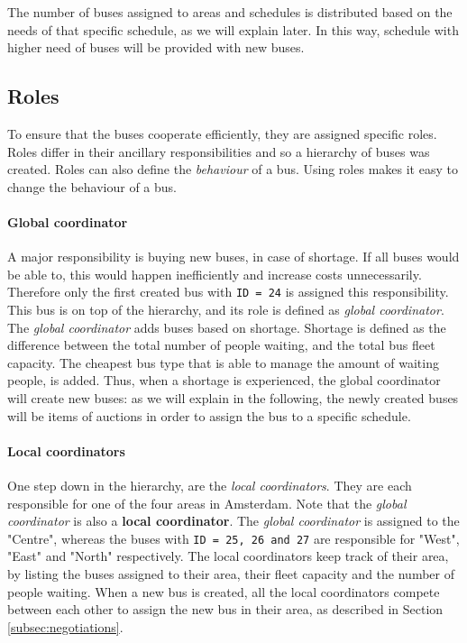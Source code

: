 \documentclass{article}
\begin{document}
The number of buses assigned to areas and schedules is distributed based on the needs of that specific schedule, as we will explain later. In this way, schedule with higher need of buses will be provided with new buses.

\subsection{Roles}
\label{subsec:roles}
To ensure that the buses cooperate efficiently, they are assigned specific roles. Roles differ in their ancillary responsibilities and so a hierarchy of buses was created. 
\newline
Roles can also define the \textit{behaviour} of a bus. Using roles makes it easy to change the behaviour of a bus. 
\paragraph{Global coordinator}
A major responsibility is buying new buses, in case of shortage. If all buses would be able to, this would happen inefficiently and increase costs unnecessarily. Therefore only the first created bus with \texttt{ID = 24} is assigned this responsibility. This bus is on top of the hierarchy, and its role is defined as \textit{global coordinator}. 
\newline
The \textit{global coordinator} adds buses based on shortage. Shortage is defined as the difference between the total number of people waiting, and the total bus fleet capacity. The cheapest bus type that is able to manage the amount of waiting people, is added. Thus, when a shortage is experienced, the global coordinator will create new buses: as we will explain in the following, the newly created buses will be items of auctions in order to assign the bus to a specific schedule.

\paragraph{Local coordinators}
One step down in the hierarchy, are the \textit{local coordinators}. They are each responsible for one of the four areas in Amsterdam. Note that the \textit{global coordinator} is also a \textbf{local coordinator}. The \textit{global coordinator} is assigned to the "Centre", whereas the buses with \texttt{ID = 25, 26 and 27} are responsible for "West", "East" and "North" respectively. The local coordinators keep track of their area, by listing the buses assigned to their area, their fleet capacity and the number of people waiting. When a new bus is created, all the local coordinators compete between each other to assign the new bus in their area, as described in Section \ref{subsec:negotiations}.
\end{document}

